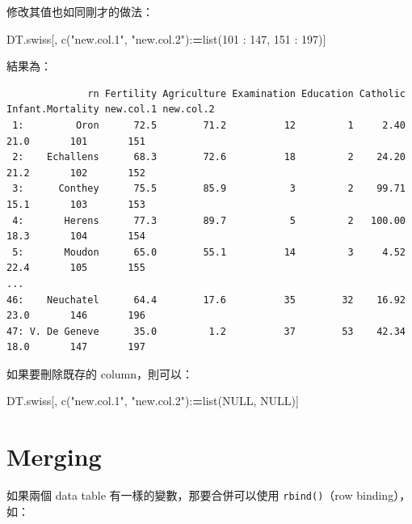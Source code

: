 \documentclass[
]{book}
\newenvironment{Shaded}{\begin{snugshade}}{\end{snugshade}}
\newcommand{\ConstantTok}[1]{\textcolor[rgb]{0.00,0.00,0.00}{#1}}
\newcommand{\DecValTok}[1]{\textcolor[rgb]{0.00,0.00,0.81}{#1}}
\newcommand{\ErrorTok}[1]{\textcolor[rgb]{0.64,0.00,0.00}{\textbf{#1}}}
\newcommand{\FunctionTok}[1]{\textcolor[rgb]{0.00,0.00,0.00}{#1}}
\newcommand{\NormalTok}[1]{#1}
\newcommand{\SpecialCharTok}[1]{\textcolor[rgb]{0.00,0.00,0.00}{#1}}
\newcommand{\StringTok}[1]{\textcolor[rgb]{0.31,0.60,0.02}{#1}}
\theoremstyle{definition}
\theoremstyle{remark}
\begin{document}
修改其值也如同剛才的做法：

\begin{Shaded}
\begin{Highlighting}[]
\NormalTok{DT.swiss[, }\FunctionTok{c}\NormalTok{(}\StringTok{"new.col.1"}\NormalTok{, }\StringTok{"new.col.2"}\NormalTok{)}\SpecialCharTok{:}\ErrorTok{=}\FunctionTok{list}\NormalTok{(}\DecValTok{101} \SpecialCharTok{:} \DecValTok{147}\NormalTok{, }\DecValTok{151} \SpecialCharTok{:} \DecValTok{197}\NormalTok{)]}
\end{Highlighting}
\end{Shaded}

結果為：

\begin{verbatim}
              rn Fertility Agriculture Examination Education Catholic Infant.Mortality new.col.1 new.col.2
 1:         Oron      72.5        71.2          12         1     2.40             21.0       101       151
 2:    Echallens      68.3        72.6          18         2    24.20             21.2       102       152
 3:      Conthey      75.5        85.9           3         2    99.71             15.1       103       153
 4:       Herens      77.3        89.7           5         2   100.00             18.3       104       154
 5:       Moudon      65.0        55.1          14         3     4.52             22.4       105       155
...
46:    Neuchatel      64.4        17.6          35        32    16.92             23.0       146       196
47: V. De Geneve      35.0         1.2          37        53    42.34             18.0       147       197
\end{verbatim}

如果要刪除既存的 column，則可以：

\begin{Shaded}
\begin{Highlighting}[]
\NormalTok{DT.swiss[, }\FunctionTok{c}\NormalTok{(}\StringTok{"new.col.1"}\NormalTok{, }\StringTok{"new.col.2"}\NormalTok{)}\SpecialCharTok{:}\ErrorTok{=}\FunctionTok{list}\NormalTok{(}\ConstantTok{NULL}\NormalTok{, }\ConstantTok{NULL}\NormalTok{)]}
\end{Highlighting}
\end{Shaded}

\hypertarget{merging}{%
\section{Merging}\label{merging}}

如果兩個 data table 有一樣的變數，那要合併可以使用 \texttt{rbind()}（row binding），如：
\end{document}
